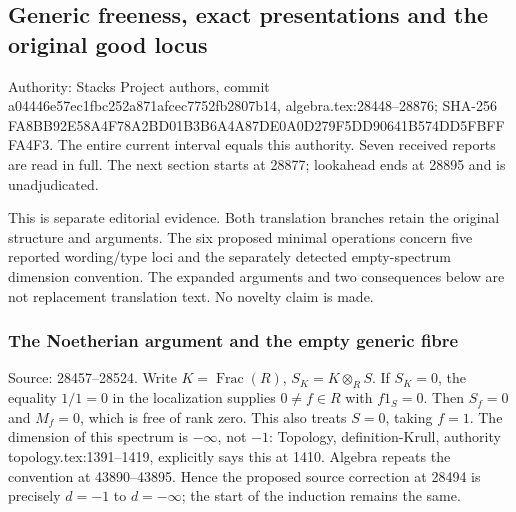 \subsection{Generic freeness, exact presentations and the original good locus}\label{algebra-proof-027-generic-freeness-exact-presentations-and-the-original-good-locus}

Authority: Stacks Project authors, commit a044\allowbreak{}46e5\allowbreak{}7ec1\allowbreak{}fbc2\allowbreak{}52a8\allowbreak{}71af\allowbreak{}cec7\allowbreak{}752f\allowbreak{}b280\allowbreak{}7b14, algebra.\AlgebraIdentifierBreak{}tex:\AlgebraIdentifierBreak{}28448--\AlgebraIdentifierBreak{}28876; SHA-256 FA8B\allowbreak{}B92E\allowbreak{}58A4\allowbreak{}F78A\allowbreak{}2BD0\allowbreak{}1B3B\allowbreak{}6A4A\allowbreak{}87DE\allowbreak{}0A0D\allowbreak{}279F\allowbreak{}5DD9\allowbreak{}0641\allowbreak{}B574\allowbreak{}DD5F\allowbreak{}BFFF\allowbreak{}A4F3. The entire current interval equals this authority. Seven received reports are read in full. The next section starts at 28877; lookahead ends at 28895 and is unadjudicated.

This is separate editorial evidence. Both translation branches retain the original structure and arguments. The six proposed minimal operations concern five reported wording/type loci and the separately detected empty-spectrum dimension convention. The expanded arguments and two consequences below are not replacement translation text. No novelty claim is made.

\subsubsection{The Noetherian argument and the empty generic fibre}\label{algebra-proof-027-the-noetherian-argument-and-the-empty-generic-fibre}

Source: 28457--28524. Write \(K=\operatorname{Frac}(R)\), \(S_K=K\otimes_R S\). If \(S_K=0\), the equality \(1/1=0\) in the localization supplies \(0\ne f\in R\) with \(f1_S=0\). Then \(S_f=0\) and \(M_f=0\), which is free of rank zero. This also treats \(S=0\), taking \(f=1\). The dimension of this spectrum is \(-\infty\), not \(-1\): Topology, definition-\AlgebraIdentifierBreak{}Krull, authority topology.\AlgebraIdentifierBreak{}tex:\AlgebraIdentifierBreak{}1391--\AlgebraIdentifierBreak{}1419, explicitly says this at 1410. Algebra repeats the convention at 43890--43895. Hence the proposed source correction at 28494 is precisely \(d=-1\) to \(d=-\infty\); the start of the induction remains the same.

